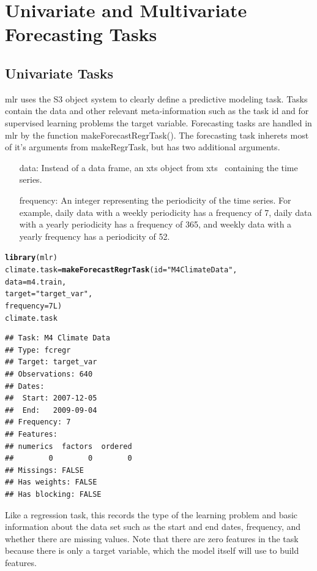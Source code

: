 \documentclass[12pt]{article}\usepackage[]{graphicx}\usepackage[]{color}
\makeatletter
\newcommand{\hlnum}[1]{\textcolor[rgb]{0.686,0.059,0.569}{#1}}%
\newcommand{\hlstr}[1]{\textcolor[rgb]{0.192,0.494,0.8}{#1}}%
\newcommand{\hlstd}[1]{\textcolor[rgb]{0.345,0.345,0.345}{#1}}%
\newcommand{\hlkwb}[1]{\textcolor[rgb]{0.69,0.353,0.396}{#1}}%
\newcommand{\hlkwc}[1]{\textcolor[rgb]{0.333,0.667,0.333}{#1}}%
\newcommand{\hlkwd}[1]{\textcolor[rgb]{0.737,0.353,0.396}{\textbf{#1}}}%
\newenvironment{kframe}{%
 \def\at@end@of@kframe{}%
 \ifinner\ifhmode%
  \def\at@end@of@kframe{\end{minipage}}%
  \begin{minipage}{\columnwidth}%
 \fi\fi%
 \def\FrameCommand##1{\hskip\@totalleftmargin \hskip-\fboxsep
 \colorbox{shadecolor}{##1}\hskip-\fboxsep
     \hskip-\linewidth \hskip-\@totalleftmargin \hskip\columnwidth}%
 \MakeFramed {\advance\hsize-\width
   \@totalleftmargin\z@ \linewidth\hsize
   \@setminipage}}%
 {\par\unskip\endMakeFramed%
 \at@end@of@kframe}
\newenvironment{knitrout}{}{} %
\theoremstyle{definition}
\newcommand\code{\@codex}
\def\@codex#1{{\normalfont\ttfamily\hyphenchar\font=-1 #1}}
\newcommand{\pkg}[1]{{\fontseries{b}\selectfont #1}}
\makeatother
\begin{document}
\section{Univariate and Multivariate Forecasting Tasks}
\label{sec:task}

\subsection{Univariate Tasks}
\label{sec:univarTask}
\pkg{mlr} uses the S3 object system to clearly define a predictive modeling task. Tasks contain the data and other relevant meta-information such as the task id and for supervised learning problems the target variable. Forecasting tasks are handled in \pkg{mlr} by the function \code{makeForecastRegrTask()}. The forecasting task inherets most of it's arguments from \code{makeRegrTask}, but has two additional arguments.

\begin{itemize}
\item[data:] Instead of a data frame, an xts object from \pkg{xts}~\cite{xts} containing the time series.
\item[frequency:] An integer representing the periodicity of the time series. For example, daily data with a weekly periodicity has a frequency of 7, daily data with a yearly periodicity has a frequency of 365, and weekly data with a yearly frequency has a periodicity of 52.
\end{itemize}

\singlespacing
\begin{knitrout}
\color{fgcolor}\begin{kframe}
\begin{alltt}
\hlkwd{library}\hlstd{(mlr)}
\hlstd{climate.task} \hlkwb{=} \hlkwd{makeForecastRegrTask}\hlstd{(}\hlkwc{id} \hlstd{=} \hlstr{"M4 Climate Data"}\hlstd{,}
                                 \hlkwc{data} \hlstd{= m4.train,}
                                 \hlkwc{target} \hlstd{=} \hlstr{"target_var"}\hlstd{,}
                                 \hlkwc{frequency} \hlstd{=} \hlnum{7L}\hlstd{)}
\hlstd{climate.task}
\end{alltt}
\begin{verbatim}
## Task: M4 Climate Data
## Type: fcregr
## Target: target_var
## Observations: 640
## Dates:
##  Start: 2007-12-05 
##  End:   2009-09-04
## Frequency: 7
## Features:
## numerics  factors  ordered 
##        0        0        0 
## Missings: FALSE
## Has weights: FALSE
## Has blocking: FALSE
\end{verbatim}
\end{kframe}
\end{knitrout}
\doublespacing
Like a regression task, this records the type of the learning problem and basic information about the data set such as the start and end dates, frequency, and whether there are missing values. Note that there are zero features in the task because there is only a target variable, which the model itself will use to build features.
\end{document}
